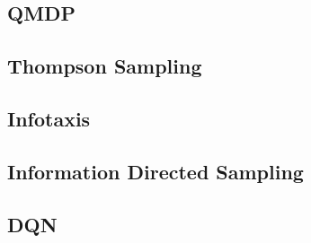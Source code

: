 \documentclass[12pt,a4paper]{article}
\begin{document}
\subsection{QMDP}
\subsection{Thompson Sampling}
\subsection{Infotaxis}
\subsection{Information Directed Sampling}
\cite{russo2017learningoptimizeinformationdirectedsampling}
\subsection{DQN}




\newpage


\end{document}
